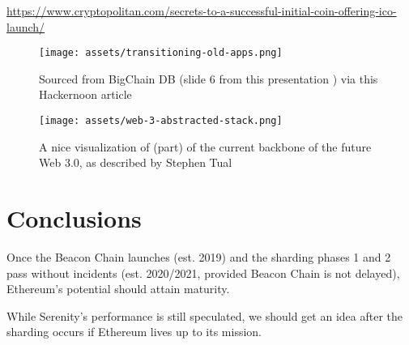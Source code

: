 \documentclass[runningheads]{llncs}
\begin{document}
\url{https://www.cryptopolitan.com/secrets-to-a-successful-initial-coin-offering-ico-launch/}



\begin{figure}
    \centering
    \texttt{[image: assets/transitioning-old-apps.png]}
    \caption[Web 2.0 to 3.0 transition]{Sourced from BigChain DB (slide 6 from this presentation \cite{BigChainArch}) via this Hackernoon article\cite{web3apps}}
    \label{fig:Serenity-3}
\end{figure}

\begin{figure}
    \centering
    \texttt{[image: assets/web-3-abstracted-stack.png]}
    \caption[Web 3.0 Abstracted Stack]{A nice visualization of (part) of the current backbone of the future Web 3.0, as described by Stephen Tual \cite{web3stack}}
    \label{fig:Serenity-3}
\end{figure}



\FloatBarrier
\section{Conclusions}
Once the Beacon Chain launches (est. 2019) and the sharding phases 1 and 2 pass without incidents (est. 2020/2021, provided Beacon Chain is not delayed), Ethereum's potential should attain maturity.

While Serenity's performance is still speculated, we should get an idea after the sharding occurs if Ethereum lives up to its mission.

\FloatBarrier
 




\end{document}
